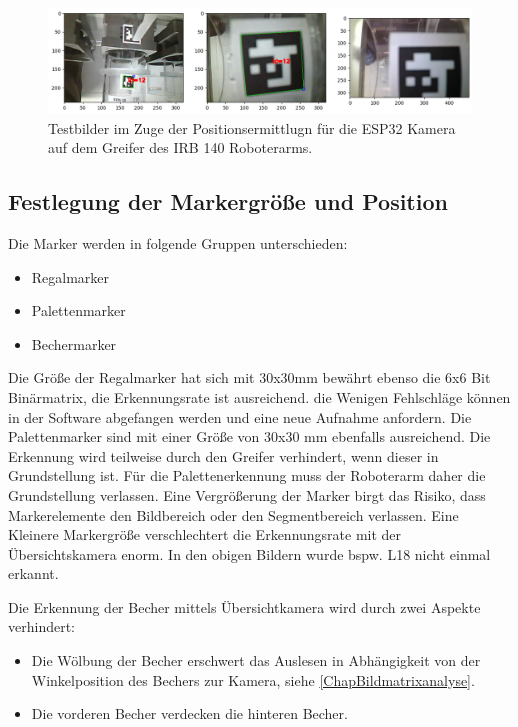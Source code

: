    \begin{figure}
        \caption[Testbilder mit ESP 32 WebCam]{Testbilder im Zuge der Positionsermittlugn für die ESP32 Kamera auf dem Greifer des IRB 140 Roboterarms.}\label{fig:figure27}
        \includegraphics[width = \textwidth]{Bilder/ESP32CamTest.png}
        \centering
    \end{figure}

    \subsection{Festlegung der Markergröße und Position}

    Die Marker werden in folgende Gruppen unterschieden:
    \begin{itemize}
        \item Regalmarker
        \item Palettenmarker
        \item Bechermarker
    \end{itemize}
    Die Größe der Regalmarker hat sich mit 30x30mm bewährt ebenso die 6x6 Bit Binärmatrix, die Erkennungsrate ist ausreichend. die Wenigen Fehlschläge können in der Software abgefangen werden und eine neue Aufnahme anfordern.
    Die Palettenmarker sind mit einer Größe von 30x30 mm ebenfalls ausreichend. 
    Die Erkennung wird teilweise durch den Greifer verhindert, wenn dieser in Grundstellung ist. 
    Für die Palettenerkennung muss der Roboterarm daher die Grundstellung verlassen. 
    Eine Vergrößerung der Marker birgt das Risiko, dass Markerelemente den Bildbereich oder den Segmentbereich verlassen. 
    Eine Kleinere Markergröße verschlechtert die Erkennungsrate mit der Übersichtskamera enorm. 
    In den obigen Bildern wurde bspw. L18 nicht einmal erkannt.
    
    Die Erkennung der Becher mittels Übersichtkamera wird durch zwei Aspekte verhindert:
    \begin{itemize}
        \item Die Wölbung der Becher erschwert das Auslesen in Abhängigkeit von der Winkelposition des Bechers zur Kamera, siehe \ref{ChapBildmatrixanalyse}.
        \item Die vorderen Becher verdecken die hinteren Becher.
    \end{itemize}


